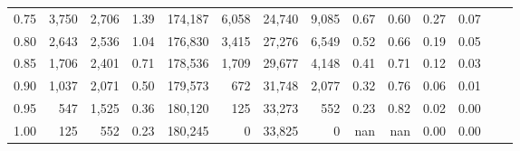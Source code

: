 \begin{tabular}{rrrrrrrrrrrrrr}
0.75 &   3,750 &  2,706 &    1.39 &  174,187 &    6,058 &  24,740 &   9,085 &  0.67 &  0.60 &  0.27 &      0.07 \\
0.80 &   2,643 &  2,536 &    1.04 &  176,830 &    3,415 &  27,276 &   6,549 &  0.52 &  0.66 &  0.19 &      0.05 \\
0.85 &   1,706 &  2,401 &    0.71 &  178,536 &    1,709 &  29,677 &   4,148 &  0.41 &  0.71 &  0.12 &      0.03 \\
0.90 &   1,037 &  2,071 &    0.50 &  179,573 &      672 &  31,748 &   2,077 &  0.32 &  0.76 &  0.06 &      0.01 \\
0.95 &     547 &  1,525 &    0.36 &  180,120 &      125 &  33,273 &     552 &  0.23 &  0.82 &  0.02 &      0.00 \\
1.00 &     125 &    552 &    0.23 &  180,245 &        0 &  33,825 &       0 &   nan &   nan &  0.00 &      0.00 \\
\bottomrule
\end{tabular}
